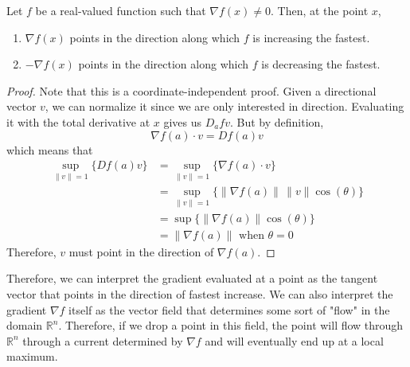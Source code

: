  \begin{lemma}
		\label{thm:gradient_increase}
		Let $f$ be a real-valued function such that $\nabla f(x) \neq 0$. Then, at the point $x$, 
		\begin{enumerate}
		  \item $\nabla f(x)$ points in the direction along which $f$ is increasing the fastest. 
			\item $-\nabla f(x)$ points in the direction along which $f$ is decreasing the fastest. 
		\end{enumerate}
  \end{lemma}
  \begin{proof}
		Note that this is a coordinate-independent proof. Given a directional vector $v$, we can normalize it since we are only interested in direction. Evaluating it with the total derivative at $x$ gives us $D_a f v$. But by definition, 
		\begin{equation}
			\nabla f(a) \cdot v = D f(a) v
		\end{equation}
		which means that 
		\begin{align}
			\sup_{\|v\| = 1} \{D f(a) v\} 
				& = \sup_{\|v\|=1} \{\nabla f(a) \cdot v\} \\
				&  = \sup_{\|v\|=1} \{ \|\nabla f(a)\| \, \|v\| \cos(\theta)\} \\
				& = \sup \{\|\nabla f(a)\| \cos(\theta)\} \\
				& = \|\nabla f(a)\| \text{ when } \theta = 0
		\end{align}
		Therefore, $v$ must point in the direction of $\nabla f(a)$. 
  \end{proof}

  Therefore, we can interpret the gradient evaluated at a point as the tangent vector that points in the direction of fastest increase. We can also interpret the gradient $\nabla f$ itself as the vector field that determines some sort of "flow" in the domain $\mathbb{R}^n$. Therefore, if we drop a point in this field, the point will flow through $\mathbb{R}^n$ through a current determined by $\nabla f$ and will eventually end up at a local maximum. 

